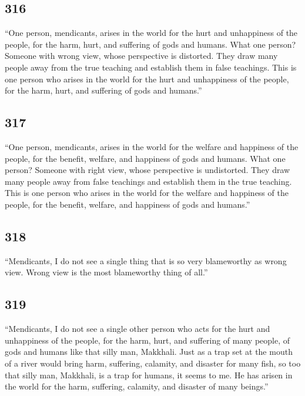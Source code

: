 \documentclass[12pt,openany]{book}%
\begin{document}
\subsection*{316 }

“One person, mendicants, arises in the world for the hurt and unhappiness of the people, for the harm, hurt, and suffering of gods and humans. What one person? Someone with wrong view, whose perspective is distorted. They draw many people away from the true teaching and establish them in false teachings. This is one person who arises in the world for the hurt and unhappiness of the people, for the harm, hurt, and suffering of gods and humans.” 

\subsection*{317 }

“One person, mendicants, arises in the world for the welfare and happiness of the people, for the benefit, welfare, and happiness of gods and humans. What one person? Someone with right view, whose perspective is undistorted. They draw many people away from false teachings and establish them in the true teaching. This is one person who arises in the world for the welfare and happiness of the people, for the benefit, welfare, and happiness of gods and humans.” 

\subsection*{318 }

“Mendicants, I do not see a single thing that is so very blameworthy as wrong view. Wrong view is the most blameworthy thing of all.” 

\subsection*{319 }

“Mendicants, I do not see a single other person who acts for the hurt and unhappiness of the people, for the harm, hurt, and suffering of many people, of gods and humans like that silly man, Makkhali. Just as a trap set at the mouth of a river would bring harm, suffering, calamity, and disaster for many fish, so too that silly man, Makkhali, is a trap for humans, it seems to me. He has arisen in the world for the harm, suffering, calamity, and disaster of many beings.” 
\end{document}
